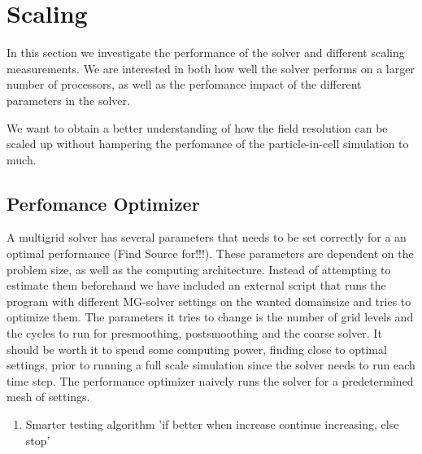 \section{Scaling}
  In this section we investigate the performance of the solver and different scaling
  measurements. We are interested in both how well the solver performs on a larger
  number of processors, as well as the perfomance impact of the different
  parameters in the solver.

  We want to obtain a better understanding of how the field resolution can be scaled
  up without hampering the perfomance of the particle-in-cell simulation to much.

  \subsection{Perfomance Optimizer}
    A multigrid solver has several parameters that needs to be set correctly for
    a an optimal performance (Find Source for!!!). These parameters are dependent on the problem size,
    as well as the computing architecture. Instead of attempting to estimate them beforehand
    we have included an external script that runs the program with different MG-solver
    settings on the wanted domainsize and tries to optimize them.
    The parameters it tries to change is the number of grid levels and the cycles
    to run for presmoothing, postsmoothing and the coarse solver. It should be worth it
    to spend some computing power, finding close to optimal settings,  prior to
    running a full scale simulation since the solver needs to run each time step.
    The performance optimizer naively runs the solver for a predetermined mesh of
    settings.

    \begin{enumerate}
      \item Smarter testing algorithm 'if better when increase continue increasing, else stop'
    \end{enumerate}
